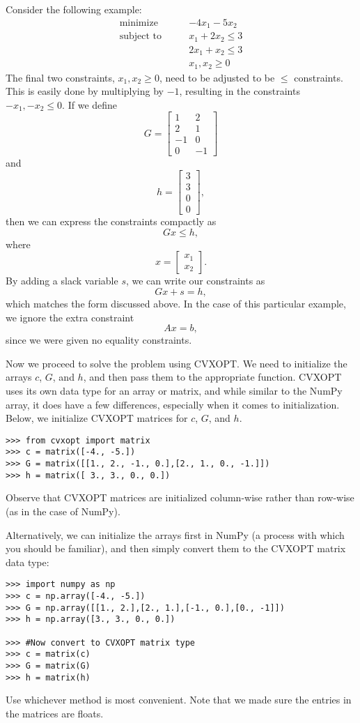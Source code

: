 Consider the following example:
\begin{align*}
\text{minimize}\qquad &-4x_1-5x_2 \\
\text{subject to}\qquad &x_1+2x_2 \leq 3 \\
	        &2x_1+x_2 \leq 3 \\
		&x_1, x_2 \geq 0
\end{align*}
The final two constraints, $x_1, x_2 \geq 0$, need to be adjusted to be $\leq$ constraints.
This is easily done by multiplying by $-1$, resulting in the constraints $-x_1, -x_2 \leq 0$.
If we define
\[
G = \begin{bmatrix}
  1 & 2\\
  2 & 1\\
  -1 & 0\\
  0 & -1
\end{bmatrix}
\]
and
\[
h = \begin{bmatrix}
  3\\
  3\\
  0\\
  0
\end{bmatrix},
\]
then we can express the constraints compactly as
\[
Gx \leq h,
\]
where
\[
x = \begin{bmatrix}
  x_1\\
  x_2
\end{bmatrix}.
\]
By adding a slack variable $s$, we can write our constraints as
\[
Gx + s = h,
\]
which matches the form discussed above. In the case of this particular example, we ignore the extra constraint
\[
Ax = b,
\]
since we were given no equality constraints.

Now we proceed to solve the problem using CVXOPT.
We need to initialize the arrays $c$, $G$, and $h$, and then pass them to the appropriate function.
CVXOPT uses its own data type for an array or matrix, and while similar to the NumPy array, it
does have a few differences, especially when it comes to initialization.
Below, we initialize CVXOPT matrices for $c$, $G$, and $h$.

\begin{lstlisting}
>>> from cvxopt import matrix
>>> c = matrix([-4., -5.])
>>> G = matrix([[1., 2., -1., 0.],[2., 1., 0., -1.]])
>>> h = matrix([ 3., 3., 0., 0.])
\end{lstlisting}
Observe that CVXOPT matrices are initialized column-wise rather than row-wise (as in the case of NumPy).

Alternatively, we can initialize the arrays first in NumPy (a process with which you should be familiar),
and then simply convert them to the CVXOPT matrix data type:
\begin{lstlisting}
>>> import numpy as np
>>> c = np.array([-4., -5.])
>>> G = np.array([[1., 2.],[2., 1.],[-1., 0.],[0., -1]])
>>> h = np.array([3., 3., 0., 0.])

>>> #Now convert to CVXOPT matrix type
>>> c = matrix(c)
>>> G = matrix(G)
>>> h = matrix(h)
\end{lstlisting}
Use whichever method is most convenient. Note that we made sure the entries in the matrices are floats.

